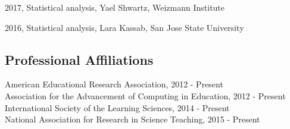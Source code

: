 \documentclass[14,]{article}
\begin{document}
2017, Statistical analysis, Yael Shwartz, Weizmann Institute

2016, Statistical analysis, Lara Kassab, San Jose State University

\hypertarget{professional-affiliations}{%
\subsection{Professional Affiliations}\label{professional-affiliations}}

American Educational Research Association, 2012 - Present\\
Association for the Advancement of Computing in Education, 2012 -
Present\\
International Society of the Learning Sciences, 2014 - Present\\
National Association for Research in Science Teaching, 2015 - Present
\end{document}
